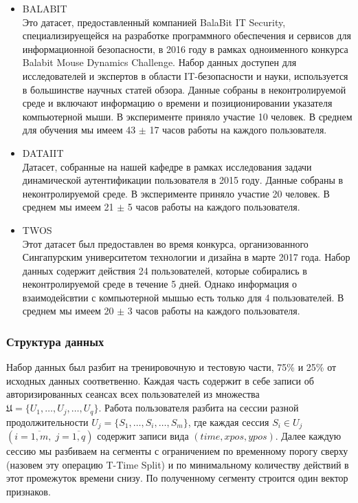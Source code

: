 \documentclass[12pt]{article}
\begin{document}
    \begin{itemize}
        \item \textsc{BALABIT} \cite{BALABIT} \\
        Это датасет, предоставленный компанией BalaBit IT Security, специализируещейся на разработке программного обеспечения и сервисов для информационной безопасности, в 2016 году в рамках одноименного конкурса Balabit Mouse Dynamics Challenge. Набор данных доступен для исследователей и экспертов в области IT-безопасности и науки, используется в большинстве научных статей обзора. Данные собраны в неконтролируемой среде и включают информацию о времени и позиционировании указателя компьютерной мыши. В эксперименте приняло участие 10 человек. В среднем для обучения мы имеем 43 $\pm$ 17 часов работы на каждого пользователя.

        \item \textsc{DATAIIT} \\
        Датасет, собранные на нашей кафедре в рамках исследования задачи динамической аутентификации пользователя в 2015 году. Данные собраны в неконтролируемой среде. В эксперименте приняло участие 20 человек. В среднем мы имеем 21 $\pm$ 5 часов работы на каждого пользователя.

        \item \textsc{TWOS} \cite{TWOS} \\
        Этот датасет был предоставлен во время конкурса, организованного Сингапурским университетом технологии и дизайна в марте 2017 года. Набор данных содержит действия 24 пользователей, которые собирались в неконтролируемой среде в течение 5 дней. Однако информация о взаимодейсвтии с компьютерной мышью есть только для 4 пользователей. В среднем мы имеем 20 $\pm$ 3 часов работы на каждого пользователя.
    \end{itemize}


    \subsubsection{Структура данных}
    \label{sec:Research:Data:Struct}
    
    \par Набор данных был разбит на тренировочную и тестовую части, 75\% и 25\% от исходных данных соответвенно. Каждая часть содержит в себе записи об авторизированных сеансах всех пользователей из множества $\mathfrak{U}=\{U_1, \ldots, U_j, \ldots, U_q\}$. Работа пользователя разбита на сессии разной продолжительности $U_j = \{S_1, \ldots, S_i, \ldots, S_m\}$, где каждая сессия $S_i \in U_j$ $(i = \overline{1,m}, \; j = \overline{1,q})$ содержит записи вида $(time, xpos, ypos)$. Далее каждую сессию мы разбиваем на сегменты с ограничением по временному порогу сверху (назовем эту операцию T-Time Split) и по минимальному количеству действий в этот промежуток времени снизу. По полученному сегменту строится один вектор признаков.
\end{document}
